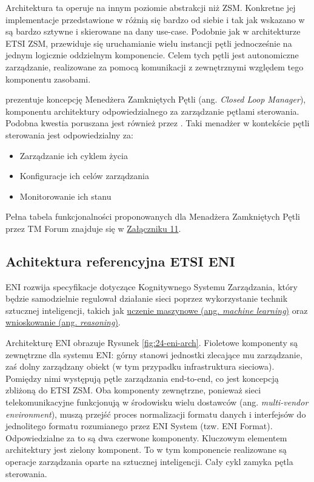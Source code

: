 Architektura ta operuje na innym poziomie abstrakcji niż ZSM. Konkretne jej implementacje przedstawione w \cite{tmforum2022} różnią się bardzo od siebie i tak jak wskazano w \cite{fallon2019} są bardzo sztywne i skierowane na dany use-case. Podobnie jak w architekturze ETSI ZSM, przewiduje się uruchamianie wielu instancji pętli jednocześnie na jednym logicznie oddzielnym komponencie. Celem tych pętli jest autonomiczne zarządzanie, realizowane za pomocą komunikacji z zewnętrznymi względem tego komponentu zasobami.

\cite{tmforum2022ai} prezentuje koncepcję Menedżera Zamkniętych Pętli (ang. \textit{Closed Loop Manager}), komponentu architektury odpowiedzialnego za zarządzanie pętlami sterowania. Podobna kwestia poruszana jest również przez \cite{ngmn2022}. Taki menadżer w kontekście pętli sterowania jest odpowiedzialny za:
\begin{itemize}
    \item Zarządzanie ich cyklem życia 
    \item Konfiguracje ich celów zarządzania
    \item Monitorowanie ich stanu
\end{itemize}

Pełna tabela funkcjonalności proponowanych dla Menadżera Zamkniętych Pętli przez TM Forum znajduje się w \hyperlink{appendix:11}{Załączniku 11}.

\subsection{Achitektura referencyjna ETSI ENI}

ENI rozwija specyfikacje dotyczące Kognitywnego Systemu Zarządzania, który będzie samodzielnie regulował działanie sieci poprzez wykorzystanie technik sztucznej inteligencji, takich jak \hyperlink{def:uczenie-maszynowe}{uczenie maszynowe (ang. \textit{machine learning})} oraz \hyperlink{def:wnioskowanie}{wnioskowanie (ang. \textit{reasoning})}. 


Architekturę ENI \cite{etsieni2023} obrazuje Rysunek \ref{fig:24-eni-arch}. Fioletowe komponenty są zewnętrzne dla systemu ENI: górny stanowi jednostki zlecające mu zarządzanie, zaś dolny zarządzany obiekt (w tym przypadku infrastruktura sieciowa). Pomiędzy nimi występują pętle zarządzania end-to-end, co jest koncepcją zbliżoną do ETSI ZSM. Oba komponenty zewnętrzne, ponieważ sieci telekomunikacyjne funkcjonują w środowisku wielu dostawców (ang. \textit{multi-vendor environment}), muszą przejść proces normalizacji formatu danych i interfejsów do jednolitego formatu rozumianego przez ENI System (tzw. ENI Format). Odpowiedzialne za to są dwa czerwone komponenty. Kluczowym elementem architektury jest zielony komponent. To w tym komponencie realizowane są operacje zarządzania oparte na sztucznej inteligencji. Cały cykl zamyka pętla sterowania. 

